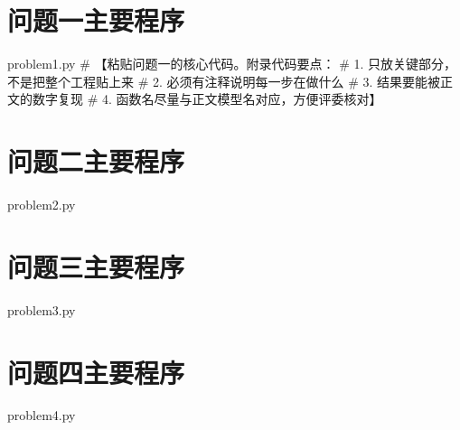 \documentclass[bwprint]{gmcmthesis}
\numberwithin{equation}{section}
\numberwithin{figure}{section}
\numberwithin{table}{section}
\begin{document}
\clearpage
\begin{appendices}

\section{问题一主要程序}

\begin{Python}{problem1.py}
# 【粘贴问题一的核心代码。附录代码要点：
#   1. 只放关键部分，不是把整个工程贴上来
#   2. 必须有注释说明每一步在做什么
#   3. 结果要能被正文的数字复现
#   4. 函数名尽量与正文模型名对应，方便评委核对】
\end{Python}

\clearpage
\section{问题二主要程序}

\begin{Python}{problem2.py}
\end{Python}

\clearpage
\section{问题三主要程序}

\begin{Python}{problem3.py}
\end{Python}

\clearpage
\section{问题四主要程序}

\begin{Python}{problem4.py}
\end{Python}


%
%
\clearpage

\end{appendices}
\end{document}
